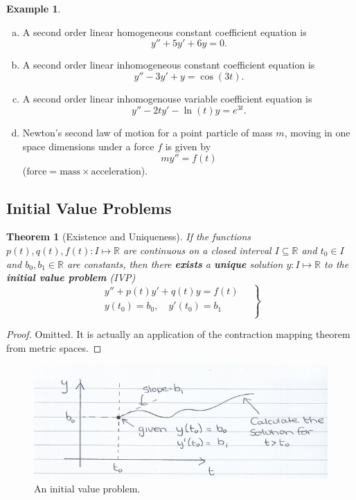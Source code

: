 \documentclass{article}
\theoremstyle{plain}
\newtheorem{thm}{Theorem}[section]
\theoremstyle{definition}
\newtheorem{exmp}{Example}[section]
\numberwithin{equation}{section}
\begin{document}
\begin{tcolorbox}
\begin{exmp}\hfill
\begin{enumerate}[(a)]
    \item A second order linear homogeneous constant coefficient equation is
    $$ y'' + 5y' + 6y = 0.$$
    \item A second order linear inhomogeneous constant coefficient equation is
    $$ y'' - 3y' + y = \cos(3t).$$
    \item A second order linear inhomogenouse variable coefficient equation is
    $$ y'' - 2ty' - \ln(t)y = e^{3t}.$$
    \item Newton's second law of motion for a point particle of mass $m$, moving in one space dimensions under a force $f$ is given by
    $$ my'' = f(t)$$
    ($\text{force} = \text{mass} \times \text{acceleration}$).
\end{enumerate}
\end{exmp}
\end{tcolorbox}

\subsection{Initial Value Problems}

\begin{thm}[Existence and Uniqueness]\label{thm:Existenceanduniqueness}
If the functions $p(t),q(t),f(t):I \mapsto \mathbb{R}$ are continuous on a closed interval $I \subseteq \mathbb{R}$ and $t_0 \in I$ and $b_0,b_1 \in \mathbb{R}$ are constants, then there \textbf{exists} a \textbf{unique} solution $y: I \mapsto \mathbb{R}$ to the \textbf{initial value problem} (IVP)
\begin{equation}\label{eq:linearIVP}
\left.
\begin{aligned}
    y'' + p(t)y' + q(t)y = f(t) \\
    y(t_0) = b_0, \quad y'(t_0) = b_1 \\
\end{aligned}\quad\right\rbrace
\end{equation}
\end{thm}

\begin{proof}
    Omitted. It is actually an application of the contraction mapping theorem from metric spaces.
\end{proof}

\begin{figure}[h]
    \centering
    \includegraphics{images/Ivpgraph.png}
    \caption{An initial value problem.}
    \label{fig:ivpgraph}
\end{figure}
\end{document}
